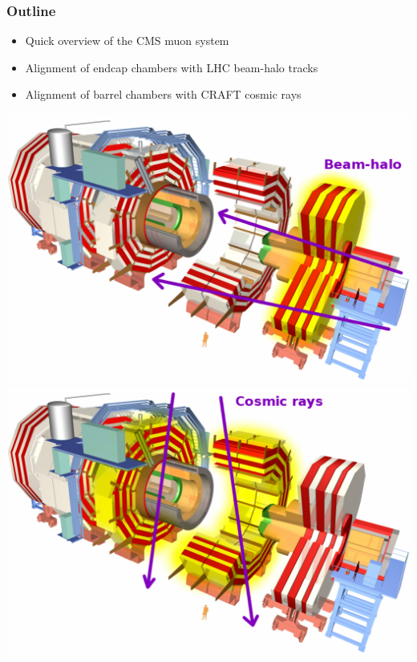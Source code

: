 \documentclass[compress]{beamer}
\begin{document}
\begin{frame}
\frametitle{Outline}
\begin{itemize}\setlength{\itemsep}{0.65 cm}
\item Quick overview of the CMS muon system

\item Alignment of endcap chambers with LHC beam-halo tracks

\item Alignment of barrel chambers with CRAFT cosmic rays
\end{itemize}

\vfill
\includegraphics[width=0.47\linewidth]{CMS_exploded_endcap.png} \hfill \includegraphics[width=0.47\linewidth]{CMS_exploded_barrel.png}
\end{frame}
\end{document}
